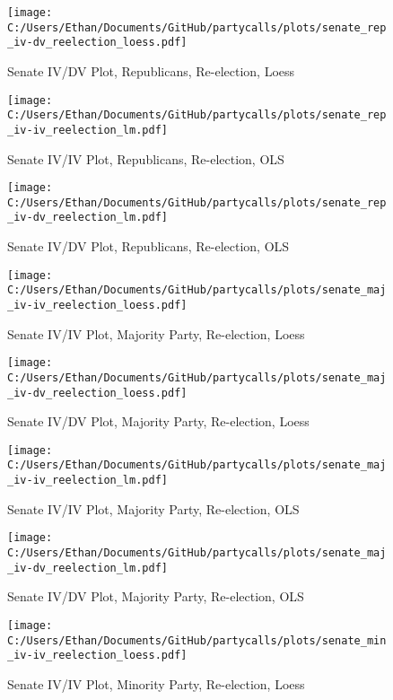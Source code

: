 \documentclass[12pt]{article}
\begin{document}
\begin{figure}[H]
	\centering
	\caption{Senate IV/DV Plot, Republicans, Re-election, Loess}
	\texttt{[image: C:/Users/Ethan/Documents/GitHub/partycalls/plots/senate\_rep\_iv-dv\_reelection\_loess.pdf]}
\end{figure}

\begin{figure}[H]
	\centering
	\caption{Senate IV/IV Plot, Republicans, Re-election, OLS}
	\texttt{[image: C:/Users/Ethan/Documents/GitHub/partycalls/plots/senate\_rep\_iv-iv\_reelection\_lm.pdf]}
\end{figure}

\begin{figure}[H]
	\centering
	\caption{Senate IV/DV Plot, Republicans, Re-election, OLS}
	\texttt{[image: C:/Users/Ethan/Documents/GitHub/partycalls/plots/senate\_rep\_iv-dv\_reelection\_lm.pdf]}
\end{figure}


\begin{figure}[H]
	\centering
	\caption{Senate IV/IV Plot, Majority Party, Re-election, Loess}
	\texttt{[image: C:/Users/Ethan/Documents/GitHub/partycalls/plots/senate\_maj\_iv-iv\_reelection\_loess.pdf]}
\end{figure}

\begin{figure}[H]
	\centering
	\caption{Senate IV/DV Plot, Majority Party, Re-election, Loess}
	\texttt{[image: C:/Users/Ethan/Documents/GitHub/partycalls/plots/senate\_maj\_iv-dv\_reelection\_loess.pdf]}
\end{figure}

\begin{figure}[H]
	\centering
	\caption{Senate IV/IV Plot, Majority Party, Re-election, OLS}
	\texttt{[image: C:/Users/Ethan/Documents/GitHub/partycalls/plots/senate\_maj\_iv-iv\_reelection\_lm.pdf]}
\end{figure}

\begin{figure}[H]
	\centering
	\caption{Senate IV/DV Plot, Majority Party, Re-election, OLS}
	\texttt{[image: C:/Users/Ethan/Documents/GitHub/partycalls/plots/senate\_maj\_iv-dv\_reelection\_lm.pdf]}
\end{figure}

\begin{figure}[H]
	\centering
	\caption{Senate IV/IV Plot, Minority Party, Re-election, Loess}
	\texttt{[image: C:/Users/Ethan/Documents/GitHub/partycalls/plots/senate\_min\_iv-iv\_reelection\_loess.pdf]}
\end{figure}
\end{document}
